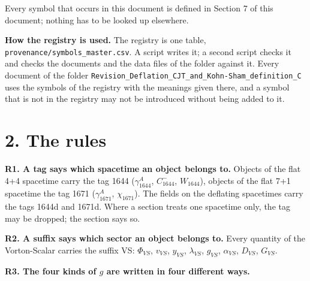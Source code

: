 \documentclass[
  10pt,
]{article}
\begin{document}
Every symbol that occurs in this document is defined in Section 7 of
this document; nothing has to be looked up elsewhere.

\textbf{How the registry is used.} The registry is one table,
\texttt{provenance/symbols\_master.csv}. A script writes it; a second
script checks it and checks the documents and the data files of the
folder against it. Every document of the folder
\texttt{Revision\_Deflation\_CJT\_and\_Kohn-Sham\_definition\_C} uses
the symbols of the registry with the meanings given there, and a symbol
that is not in the registry may not be introduced without being added to
it.

\hypertarget{the-rules}{%
\section{2. The rules}\label{the-rules}}

\textbf{R1. A tag says which spacetime an object belongs to.} Objects of
the flat 4+4 spacetime carry the tag 1644 (\(\gamma_{1644}^A\),
\(C^-_{1644}\), \(W_{1644}\)), objects of the flat 7+1 spacetime the tag
1671 (\(\gamma_{1671}^A\), \(\chi_{1671}\)). The fields on the deflating
spacetimes carry the tags 1644d and 1671d. Where a section treats one
spacetime only, the tag may be dropped; the section says so.

\textbf{R2. A suffix says which sector an object belongs to.} Every
quantity of the Vorton-Scalar carries the suffix VS: \(\Phi_{VS}\),
\(v_{VS}\), \(y_{VS}\), \(\lambda_{VS}\), \(g_{VS}\), \(\alpha_{VS}\),
\(D_{VS}\), \(G_{VS}\).

\textbf{R3. The four kinds of \(g\) are written in four different ways.}
\end{document}
